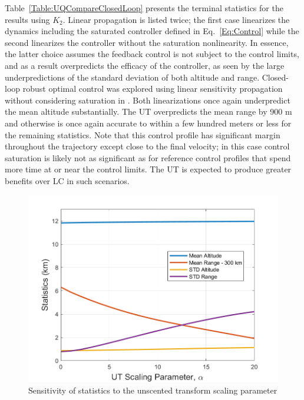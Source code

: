 Table~\ref{Table:UQCompareClosedLoop} presents the terminal statistics for the results using $K_2$. Linear propagation is listed twice; the first case linearizes the dynamics including the saturated controller defined in Eq.~\eqref{Eq:Control} while the second linearizes the controller without the saturation nonlinearity. In essence, the latter choice assumes the feedback control is not subject to the control limits, and as a result overpredicts the efficacy of the controller, as seen by the large underpredictions of the standard deviation of both altitude and range. Closed-loop robust optimal control was explored using linear sensitivity propagation without considering saturation in \cite{MarsEntryDesensitized}.
Both linearizations once again underpredict the mean altitude substantially. The UT overpredicts the mean range by 900 m and otherwise is once again accurate to within a few hundred meters or less for the remaining statistics. Note that this control profile has significant margin throughout the trajectory except close to the final velocity; in this case control saturation is likely not as significant as for reference control profiles that spend more time at or near the control limits. The UT is expected to produce greater benefits over LC in such scenarios.

\begin{figure}[h!]
	\centering
	\includegraphics[width=1\textwidth]{Images/AlphaSensitivity}
	\caption{Sensitivity of statistics to the unscented transform scaling parameter}
	\label{Fig:AlphaSensitivity}
\end{figure}

